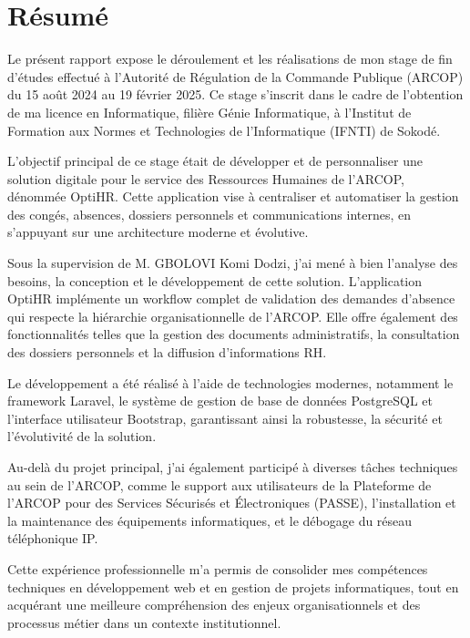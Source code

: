 \setcounter{page}{2}  %
\chapter*{Résumé}
    Le présent rapport expose le déroulement et les réalisations de mon stage de fin d'études effectué à l'Autorité de Régulation de la Commande Publique (ARCOP) du 15 août 2024 au 19 février 2025. Ce stage s'inscrit dans le cadre de l'obtention de ma licence en Informatique, filière Génie Informatique, à l'Institut de Formation aux Normes et Technologies de l'Informatique (IFNTI) de Sokodé.
    
    L'objectif principal de ce stage était de développer et de personnaliser une solution digitale pour le service des Ressources Humaines de l'ARCOP, dénommée OptiHR. Cette application vise à centraliser et automatiser la gestion des congés, absences, dossiers personnels et communications internes, en s'appuyant sur une architecture moderne et évolutive.
    
    Sous la supervision de M. GBOLOVI Komi Dodzi, j'ai mené à bien l'analyse des besoins, la conception et le développement de cette solution. L'application OptiHR implémente un workflow complet de validation des demandes d'absence qui respecte la hiérarchie organisationnelle de l'ARCOP. Elle offre également des fonctionnalités telles que la gestion des documents administratifs, la consultation des dossiers personnels et la diffusion d'informations RH.
    
    Le développement a été réalisé à l'aide de technologies modernes, notamment le framework Laravel, le système de gestion de base de données PostgreSQL et l'interface utilisateur Bootstrap, garantissant ainsi la robustesse, la sécurité et l'évolutivité de la solution.
    
    Au-delà du projet principal, j'ai également participé à diverses tâches techniques au sein de l'ARCOP, comme le support aux utilisateurs de la Plateforme de l'ARCOP pour des Services Sécurisés et Électroniques (PASSE), l'installation et la maintenance des équipements informatiques, et le débogage du réseau téléphonique IP.
    
    Cette expérience professionnelle m'a permis de consolider mes compétences techniques en développement web et en gestion de projets informatiques, tout en acquérant une meilleure compréhension des enjeux organisationnels et des processus métier dans un contexte institutionnel.
\clearpage